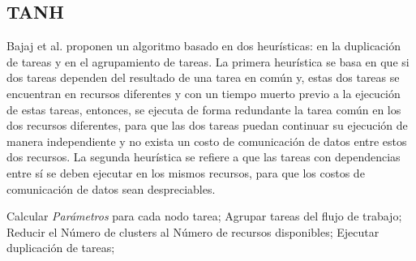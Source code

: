 \subsection{TANH}
\label{alg:tanh}
Bajaj et al. \cite{bajaj2004improving} proponen un algoritmo basado en dos heurísticas: en la duplicación de tareas y en el agrupamiento de tareas. La primera heurística se basa en que si dos tareas dependen del resultado de una tarea en común y, estas dos tareas se encuentran en recursos diferentes y con un tiempo muerto previo a la ejecución de estas tareas, entonces, se ejecuta de forma redundante la tarea común en los dos recursos diferentes, para que las dos tareas puedan continuar su ejecución de manera independiente y no exista un costo de comunicación de datos entre estos dos recursos. La segunda heurística se refiere a que las tareas con dependencias entre sí se deben ejecutar en los mismos recursos, para que los costos de comunicación de datos sean despreciables.

\begin{algorithmic}[1]
\State Calcular \emph{Parámetros} para cada nodo tarea;
\State Agrupar tareas del flujo de trabajo;
	\State Reducir el Número de clusters al Número de recursos disponibles;
\Else
	\State Ejecutar duplicación de tareas;
\EndIf
\end{algorithmic}




